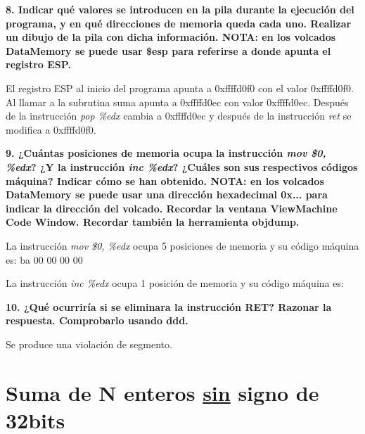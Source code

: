 \documentclass{article}
\begin{document}
  \begin{flushleft}
    \textbf{8. Indicar qué valores se introducen en la pila durante la ejecución del
    programa, y en qué direcciones de memoria queda cada uno. Realizar un dibujo de
    la pila con dicha información. NOTA: en los volcados Data\textrightarrow Memory se puede usar
    \$esp para referirse a donde apunta el registro ESP.} \break

    El registro ESP al inicio del programa apunta a 0xffffd0f0 con el valor 0xffffd0f0.
    Al llamar a la subrutina suma apunta a 0xffffd0ec	con valor 0xffffd0ec.
    Después de la instrucción \textit{pop \%edx} cambia a 0xffffd0ec y después de
    la instrucción \textit{ret} se modifica a 0xffffd0f0.
  \end{flushleft}

  \begin{flushleft}
    \textbf{9. ¿Cuántas posiciones de memoria ocupa la instrucción \textit{mov \$0, \%edx}?
    ¿Y la instrucción \textit{inc \%edx}? ¿Cuáles son sus respectivos códigos máquina? Indicar
    cómo se han obtenido. NOTA: en los volcados Data\textrightarrow Memory se puede usar una
    dirección hexadecimal 0x... para indicar la dirección del volcado. Recordar la ventana
    View\textrightarrow Machine Code Window. Recordar también la herramienta objdump.} \break

    La instrucción \textit{mov \$0, \%edx} ocupa 5 posiciones de memoria y su código máquina es: \break
    ba 00 00 00 00

    La instrucción \textit{inc \%edx} ocupa 1 posición de memoria y su código máquina es: 
  \end{flushleft}

  \begin{flushleft}
    \textbf{10.  ¿Qué ocurriría si se eliminara la instrucción RET? Razonar la
    respuesta. Comprobarlo usando ddd.} \break

    Se produce una violación de segmento.
  \end{flushleft}

\newpage
\section{Suma de N enteros \underline{sin} signo de 32bits}
\end{document}
